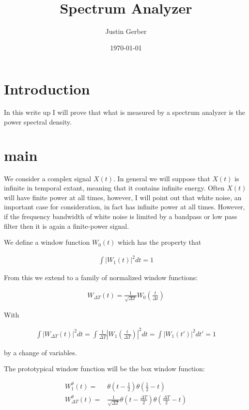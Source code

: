 \documentclass[12pt]{article}
\begin{document}
\title{Spectrum Analyzer}
\author{Justin Gerber}
\date{\today}
\maketitle

\section{Introduction}

In this write up I will prove that what is measured by a spectrum analyzer is the power spectral density.

\section{main}

We consider a complex signal $X(t)$.
In general we will suppose that $X(t)$ is infinite in temporal extant, meaning that it contains infinite energy.
Often $X(t)$ will have finite power at all times, however, I will point out that white noise, an important case for consideration, in fact has infinite power at all times.
However, if the frequency bandwidth of white noise is limited by a bandpass or low pass filter then it is again a finite-power signal.

We define a window function $W_0(t)$ which has the property that

\begin{align}
\int |W_1(t)|^2 dt = 1
\end{align}

From this we extend to a family of normalized window functions:

\begin{align}
W_{\Delta T}(t) = \frac{1}{\sqrt{\Delta T}} W_0\left(\frac{t}{\Delta t}\right)
\end{align}

With

\begin{align}
\int |W_{\Delta T}(t)|^2 dt = \int \frac{1}{\Delta T} \left|W_1\left(\frac{t}{\Delta T}\right)\right|^2 dt = \int |W_1(t')|^2 dt' = 1
\end{align}

by a change of variables.

The prototypical window function will be the box window function:

\begin{align}
W^{\theta}_1(t) =& \theta\left(t-\frac{1}{2}\right)\theta\left(\frac{1}{2}-t\right)\\
W^{\theta}_{\Delta T}(t) =& \frac{1}{\sqrt{\Delta T}}\theta\left(t-\frac{\Delta T}{2}\right)\theta\left(\frac{\Delta T}{2}-t\right)
\end{align}
\end{document}
